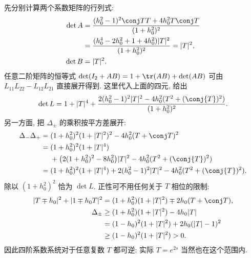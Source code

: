 先分别计算两个系数矩阵的行列式:
\[
\begin{aligned}
\det A
&=\dfrac{(h_0^2-1)^2\conj T T+4h_0^2T\conj T}
{(1+h_0^2)^2}\\
&=\dfrac{(h_0^4-2h_0^2+1+4h_0^2)|T|^2}
{(1+h_0^2)^2}=|T|^2,\\
\det B&=|T|^2.
\end{aligned}
\]
任意二阶矩阵的恒等式
$\det(I_2+ A B)
=1+\tr( A B)+\det( A B)$
可由 $L_{11}L_{22}-L_{12}L_{21}$ 直接展开得到.
这里代入上面的四元, 给出
\[
\det L
=1+|T|^4
+\dfrac{2(h_0^2-1)^2|T|^2
-4h_0^2(T^2+(\conj{T})^2)}{(1+h_0^2)^2}.
\]
另一方面, 把 $\Delta_\pm$ 的乘积按平方差展开:
\[
\begin{aligned}
\Delta_-\Delta_+
={}&(1+h_0^2)^2(1+|T|^2)^2
-4h_0^2(T+\conj T)^2\\
={}&(1+h_0^2)^2(1+|T|^4)\\
&+\bigl(2(1+h_0^2)^2-8h_0^2\bigr)|T|^2
-4h_0^2(T^2+(\conj{T})^2)\\
={}&(1+h_0^2)^2(1+|T|^4)
+2(h_0^2-1)^2|T|^2
-4h_0^2(T^2+(\conj{T})^2).
\end{aligned}
\]
除以 $(1+h_0^2)^2$ 恰为 $\det L$.
正性可不用任何关于 $T$ 相位的限制:
\[
\begin{aligned}
|T\mp h_0|^2+|1\mp h_0T|^2
&=(1+h_0^2)(1+|T|^2)
\mp2h_0(T+\conj T),\\
\Delta_\pm
&\ge(1+h_0^2)(1+|T|^2)-4h_0|T|\\
&=(1-h_0)^2(1+|T|^2)
+2h_0(|T|-1)^2\\
&\ge(1-h_0)^2(1+|T|^2)>0.
\end{aligned}
\]
因此四阶系数系统对于任意复数 $T$ 都可逆;
实际 $T=e^{2s}$ 当然也在这个范围内.

